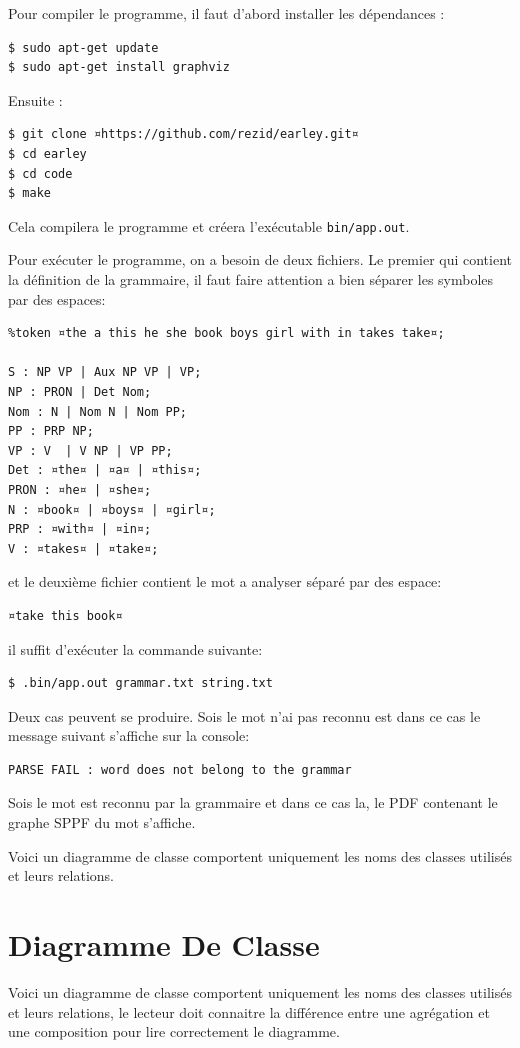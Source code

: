 \documentclass[10pt]{report}
\begin{document}
Pour compiler le programme, il faut d'abord installer les dépendances :
\begin{lstlisting}
$ sudo apt-get update
$ sudo apt-get install graphviz
\end{lstlisting}

Ensuite :

\begin{lstlisting}
$ git clone ¤https://github.com/rezid/earley.git¤
$ cd earley
$ cd code
$ make
\end{lstlisting}

Cela compilera le programme et créera l'exécutable \lstinline|bin/app.out|.

Pour exécuter le programme, on a besoin de deux fichiers. Le premier qui contient la définition de la grammaire, il faut faire attention a bien séparer les symboles par des espaces:
\begin{lstlisting}
%token ¤the a this he she book boys girl with in takes take¤;

S : NP VP | Aux NP VP | VP;
NP : PRON | Det Nom;
Nom : N | Nom N | Nom PP;
PP : PRP NP;
VP : V  | V NP | VP PP;
Det : ¤the¤ | ¤a¤ | ¤this¤;
PRON : ¤he¤ | ¤she¤;
N : ¤book¤ | ¤boys¤ | ¤girl¤;
PRP : ¤with¤ | ¤in¤;
V : ¤takes¤ | ¤take¤;
\end{lstlisting}
et le deuxième fichier contient le mot a analyser séparé par des espace:
\begin{lstlisting}
¤take this book¤
\end{lstlisting}

il suffit d'exécuter la commande suivante:
\begin{lstlisting}
$ .bin/app.out grammar.txt string.txt
\end{lstlisting}

Deux cas peuvent se produire. Sois le mot n'ai pas reconnu est dans ce cas le message suivant s'affiche sur la console:
\begin{lstlisting}
PARSE FAIL : word does not belong to the grammar 
\end{lstlisting}

Sois le mot est reconnu par la grammaire et dans ce cas la, le PDF contenant le graphe SPPF du mot s'affiche.

Voici un diagramme de classe comportent uniquement les noms des classes utilisés et leurs relations.

\section{Diagramme De Classe}
Voici un diagramme de classe comportent uniquement les noms des classes utilisés et leurs relations, le lecteur doit connaitre la différence entre une agrégation et une composition pour lire correctement le diagramme.
\end{document}
